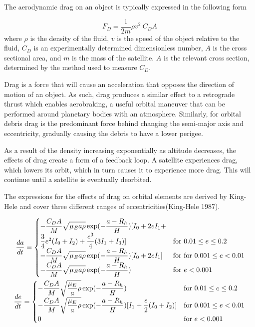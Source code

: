 \documentclass[a4paper, 12pt]{article}
\begin{document}
The aerodynamic drag on an object is typically expressed in the following form

\begin{equation}
	F_D = \frac{1}{2m} \rho v^2 \: C_D A
\end{equation}
where $\rho$ is the density of the fluid, $v$ is the speed of the object relative to the fluid, $C_D$ is an experimentally determined dimensionless number, $A$ is the cross sectional area, and $m$ is the mass of the satellite. $A$ is the relevant cross section, determined by the method used to measure $C_D$. 

Drag is a force that will cause an acceleration that opposes the direction of motion of an object. As such, drag produces a similar effect to a retrograde thrust which enables aerobraking, a useful orbital maneuver that can be performed around planetary bodies with an atmosphere. Similarly, for orbital debris drag is the predominant force behind changing the semi-major axis and eccentricity, gradually causing the debris to have a lower perigee.

As a result of the density increasing exponentially as altitude decreases, the effects of drag create a form of a feedback loop. A satellite experiences drag, which lowers its orbit, which in turn causes it to experience more drag. This will continue until a satellite is eventually deorbited. 

The expressions for the effects of drag on orbital elements are derived by King-Hele and cover three different ranges of eccentricities(King-Hele 1987).

\begin{align}
		\dfrac{da}{dt} = \begin{cases}
			-\dfrac{C_D A}{M} \sqrt{\mathstrut\mu_E a \rho} \exp(-\dfrac{a - R_h}{H})[I_0 
			+ 2eI_1 + \\ \dfrac{3}{4}e^2(I_0 + I_2) + \dfrac{e^3}{4}(3I_1 +I_3)] & \text{for } 0.01 \leq e \leq 0.2 \\
			-\dfrac{C_D A}{M} \sqrt{\mathstrut\mu_E a \rho}\exp(-\dfrac{a - R_h}{H})[I_0 + 2eI_1 ] & \text{for } \text{for } 0.001 \leq e < 0.01\\
			-\dfrac{C_D A}{M} \sqrt{\mathstrut\mu_E a \rho}\exp(-\dfrac{a - R_h}{H}) & \text{for } e < 0.001
		\end{cases}\\
		\newline
		\dfrac{de}{dt} = \begin{cases}
			-\dfrac{C_D A}{M} \sqrt{\mathstrut\dfrac{\mu_E}{a} \rho}\exp(-\dfrac{a - R_h}{H}) & \text{for } 0.01 \leq e \leq 0.2  \\
			-\dfrac{C_D A}{M} \sqrt{\mathstrut\dfrac{\mu_E}{a} \rho}\exp(-\dfrac{a - R_h}{H})[I_1 + \dfrac{e}{2}(I_0 + I_2)] & \text{for } 0.001 \leq e < 0.01\\
			0 & \text{for } e < 0.001
		\end{cases}
	\end{align}
\end{document}
